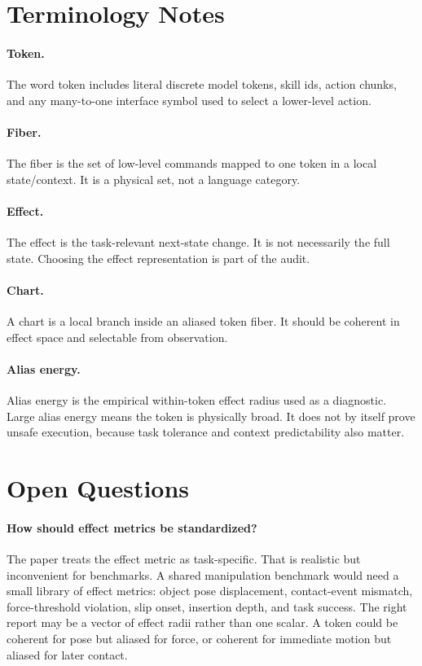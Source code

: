 \documentclass{article}
\begin{document}
\section{Terminology Notes}

\paragraph{Token.}
The word token includes literal discrete model tokens, skill ids, action
chunks, and any many-to-one interface symbol used to select a lower-level
action.

\paragraph{Fiber.}
The fiber is the set of low-level commands mapped to one token in a local
state/context. It is a physical set, not a language category.

\paragraph{Effect.}
The effect is the task-relevant next-state change. It is not necessarily the
full state. Choosing the effect representation is part of the audit.

\paragraph{Chart.}
A chart is a local branch inside an aliased token fiber. It should be coherent
in effect space and selectable from observation.

\paragraph{Alias energy.}
Alias energy is the empirical within-token effect radius used as a diagnostic.
Large alias energy means the token is physically broad. It does not by itself
prove unsafe execution, because task tolerance and context predictability also
matter.

\section{Open Questions}

\paragraph{How should effect metrics be standardized?}
The paper treats the effect metric as task-specific. That is realistic but
inconvenient for benchmarks. A shared manipulation benchmark would need a small
library of effect metrics: object pose displacement, contact-event mismatch,
force-threshold violation, slip onset, insertion depth, and task success. The
right report may be a vector of effect radii rather than one scalar. A token
could be coherent for pose but aliased for force, or coherent for immediate
motion but aliased for later contact.
\end{document}
